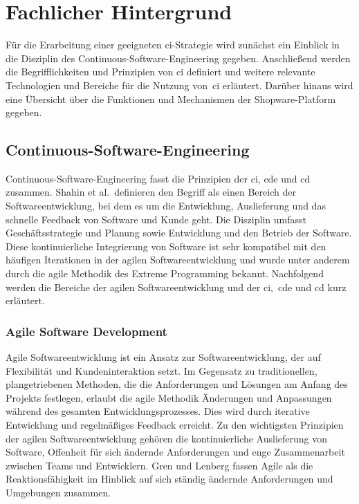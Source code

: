
\section{Fachlicher Hintergrund} \label{sec:02-background}

Für die Erarbeitung einer geeigneten \acrshort{ci}-Strategie wird zunächst ein Einblick in die Disziplin des
Continuous-Software-Engineering gegeben.
Anschließend werden die Begrifflichkeiten und Prinzipien von \acrlong{ci} definiert und weitere
relevante Technologien und Bereiche für die Nutzung von\ \acrshort{ci} erläutert.
Darüber hinaus wird eine Übersicht über die Funktionen und Mechanismen der Shopware-Platform gegeben.

\subsection{Continuous-Software-Engineering} \label{subsec:02-background-1}

Continuous-Software-Engineering fasst die Prinzipien der \acrfull{ci}, \acrfull{cde} und \acrfull{cd} zusammen.
Shahin et al.\ definieren den Begriff als einen Bereich der Softwareentwicklung, bei dem es um die Entwicklung,
Auslieferung und das schnelle Feedback von Software und Kunde geht.
Die Disziplin umfasst Geschäftsstrategie und Planung sowie Entwicklung und den Betrieb der Software.
Diese kontinuierliche Integrierung von Software ist sehr kompatibel mit den häufigen Iterationen in der agilen
Softwareentwicklung und wurde unter anderem durch die agile Methodik des Extreme Programming bekannt.
Nachfolgend werden die Bereiche der agilen Softwareentwicklung und der \acrshort{ci},\ \acrshort{cde} und \acrshort{cd}
kurz erläutert.

\subsubsection{Agile Software Development}

Agile Softwareentwicklung ist ein Ansatz zur Softwareentwicklung, der auf Flexibilität und Kundeninteraktion setzt.
Im Gegensatz zu traditionellen, plangetriebenen Methoden, die die Anforderungen und Lösungen am Anfang des Projekts
festlegen, erlaubt die agile Methodik Änderungen und Anpassungen während des gesamten Entwicklungsprozesses.
Dies wird durch iterative Entwicklung und regelmäßiges Feedback erreicht.
Zu den wichtigsten Prinzipien der agilen Softwareentwicklung gehören die kontinuierliche Auslieferung von Software,
Offenheit für sich ändernde Anforderungen und enge Zusammenarbeit zwischen Teams und Entwicklern.
Gren und Lenberg fassen Agile als die Reaktionsfähigkeit im Hinblick auf sich ständig ändernde Anforderungen
und Umgebungen zusammen.

